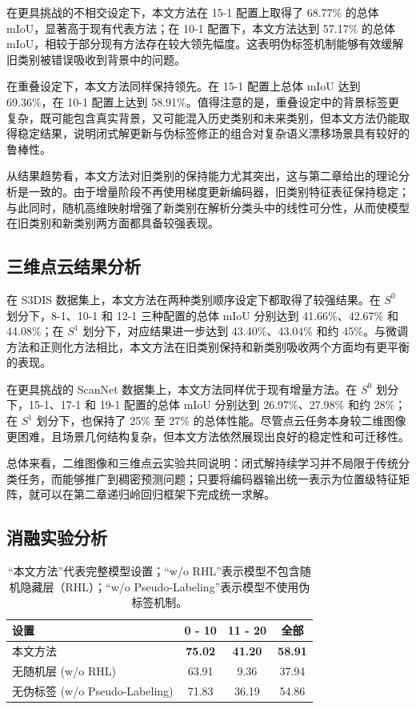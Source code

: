 在更具挑战的不相交设定下，本文方法在 15-1 配置上取得了 68.77\% 的总体 mIoU，显著高于现有代表方法；在 10-1 配置下，本文方法达到 57.17\% 的总体 mIoU，相较于部分现有方法存在较大领先幅度。这表明伪标签机制能够有效缓解旧类别被错误吸收到背景中的问题。

在重叠设定下，本文方法同样保持领先。在 15-1 配置上总体 mIoU 达到 69.36\%，在 10-1 配置上达到 58.91\%。值得注意的是，重叠设定中的背景标签更复杂，既可能包含真实背景，又可能混入历史类别和未来类别，但本文方法仍能取得稳定结果，说明闭式解更新与伪标签修正的组合对复杂语义漂移场景具有较好的鲁棒性。

从结果趋势看，本文方法对旧类别的保持能力尤其突出，这与第二章给出的理论分析是一致的。由于增量阶段不再使用梯度更新编码器，旧类别特征表征保持稳定；与此同时，随机高维映射增强了新类别在解析分类头中的线性可分性，从而使模型在旧类别和新类别两方面都具备较强表现。

\subsection{三维点云结果分析}

在 S3DIS 数据集上，本文方法在两种类别顺序设定下都取得了较强结果。在 $S^0$ 划分下，8-1、10-1 和 12-1 三种配置的总体 mIoU 分别达到 41.66\%、42.67\% 和 44.08\%；在 $S^1$ 划分下，对应结果进一步达到 43.40\%、43.04\% 和约 45\%。与微调方法和正则化方法相比，本文方法在旧类别保持和新类别吸收两个方面均有更平衡的表现。

在更具挑战的 ScanNet 数据集上，本文方法同样优于现有增量方法。在 $S^0$ 划分下，15-1、17-1 和 19-1 配置的总体 mIoU 分别达到 26.97\%、27.98\% 和约 28\%；在 $S^1$ 划分下，也保持了 25\% 至 27\% 的总体性能。尽管点云任务本身较二维图像更困难，且场景几何结构复杂，但本文方法依然展现出良好的稳定性和可迁移性。

总体来看，二维图像和三维点云实验共同说明：闭式解持续学习并不局限于传统分类任务，而能够推广到稠密预测问题；只要将编码器输出统一表示为位置级特征矩阵，就可以在第二章递归岭回归框架下完成统一求解。

\subsection{消融实验分析}

\begin{table}[htbp]
    \centering
    \caption{“本文方法”代表完整模型设置；“w/o RHL”表示模型不包含随机隐藏层（RHL）；“w/o Pseudo-Labeling”表示模型不使用伪标签机制。}
    \begin{tabular}{lccc}
        \toprule
        设置 & 0 - 10 & 11 - 20 & 全部 \\
        \midrule
        本文方法 & \textbf{75.02} & \textbf{41.20} & \textbf{58.91} \\
        无随机层 (w/o RHL) & 63.91 & 9.36 &  37.94 \\
        无伪标签 (w/o Pseudo-Labeling) & 71.83 & 36.19 & 54.86 \\
        \bottomrule
    \end{tabular}
    \label{tab:ablation}
\end{table}


